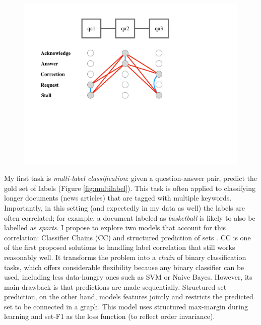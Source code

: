 \begin{figure}
\begin{minipage}{.5\textwidth}
  \includegraphics[width=1\linewidth]{plots/multilabel_context.pdf}
  \label{fig:multilabel_context}
\end{minipage}
\end{figure}

 My first task is \emph{multi-label classification}: given a question-answer pair, predict the gold set of labels (Figure \ref{fig:multilabel}). This task is often applied to classifying longer documents (news articles) that are tagged with multiple keywords. Importantly, in this setting (and expectedly in my data as well) the labels are often correlated; for example, a document labeled as \textit{basketball} is likely to also be labelled as \textit{sports}. I propose to explore two models that account for this correlation: Classifier Chains (\textsc{CC}) \cite{Read:2011} and structured prediction of sets \cite{Rabinovich:2017}. \textsc{CC} is one of the first proposed solutions to handling label correlation that still works reasonably well. It transforms the problem into a \emph{chain} of binary classification tasks, which offers considerable flexibility because any binary classifier can be used, including less data-hungry ones such as SVM or Naive Bayes. However, its main drawback is that predictions are made sequentially. Structured set prediction, on the other hand, models features jointly and restricts the predicted set to be connected in a graph. This model uses structured max-margin during learning and set-F1 as the loss function (to reflect order invariance).

